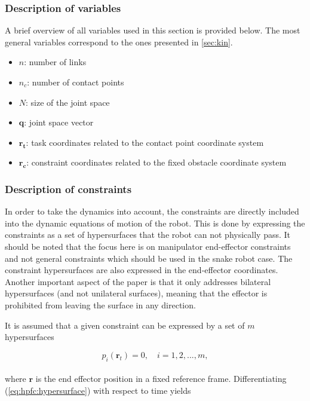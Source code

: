 \subsubsection{Description of variables}

A brief overview of all variables used in this section is provided below.
The most general variables correspond to the ones presented in \ref{sec:kin}.

\begin{itemize}
    \item $n$: number of links
    \item $n_c$: number of contact points
    \item $N$: size of the joint space
    \item $\mathbf{q}$: joint space vector
    \item $\mathbf{r_t}$: task coordinates related to the contact point coordinate system
    \item $\mathbf{r_c}$: constraint coordinates related to the fixed obstacle coordinate system
\end{itemize}


\subsubsection{Description of constraints}

In order to take the dynamics into account, the constraints are directly included into the dynamic equations of motion of the robot. This is done by expressing the constraints as a set of hypersurfaces that the robot can not physically pass. It should be noted that the focus here is on manipulator end-effector constraints and not general constraints which should be used in the snake robot case. The constraint hypersurfaces are also expressed in the end-effector coordinates. Another important aspect of the paper is that it only addresses bilateral hypersurfaces (and not unilateral surfaces), meaning that the effector is prohibited from leaving the surface in any direction.

It is assumed that a given constraint can be expressed by a set of $m$ hypersurfaces

\begin{equation}\label{eq:hpfc:hypersurface}
    p_i(\mathbf{r}_t) = 0, \quad i = 1, 2, ..., m,
\end{equation}
\\
where $\mathbf{r}$ is the end effector position in a fixed reference frame. Differentiating (\ref{eq:hpfc:hypersurface}) with respect to time yields

